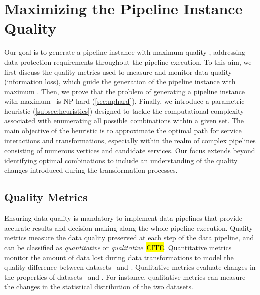 \section{Maximizing the Pipeline Instance Quality}\label{sec:heuristics}
%
Our goal is to generate a pipeline instance with maximum quality \q, addressing data protection requirements throughout the pipeline execution. To this aim, we first discuss the quality metrics used to measure and monitor data quality (information loss), which guide the generation of the pipeline instance with maximum \q. Then, we prove that the problem of generating a pipeline instance with maximum \q\ is NP-hard (\cref{sec:nphard}). Finally, we introduce a parametric heuristic (\cref{subsec:heuristics}) designed to tackle the computational complexity associated with enumerating all possible combinations within a given set. The main objective of the heuristic is to approximate the optimal path for service interactions and transformations, especially within the realm of complex pipelines consisting of numerous vertices and candidate services. Our focus extends beyond identifying optimal combinations to include an understanding of the quality changes introduced during the transformation processes.


\subsection{Quality Metrics}\label{subsec:metrics}
Ensuring data quality is mandatory to implement data pipelines that provide accurate results and decision-making along the whole pipeline execution. Quality metrics measure the data quality preserved at each step of the data pipeline, and can be classified as \emph{quantitative} or \emph{qualitative}~\cite{ADD}\hl{CITE}.
Quantitative metrics monitor the amount of data lost during data transformations to model the quality difference between datasets \origdataset\ and \transdataset.
Qualitative metrics evaluate changes in the properties of datasets \origdataset\ and \transdataset. For instance, qualitative metrics can measure the changes in the statistical distribution of the two datasets.

